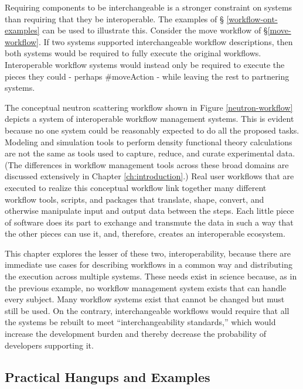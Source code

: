 Requiring components to be interchangeable is a stronger constraint on systems
than requiring that they be interoperable. The examples of \S
\ref{workflow-ont-examples} can be used to illustrate this. Consider the move
workflow of \S \ref{move-workflow}. If two systems supported interchangeable
workflow descriptions, then both systems would be required to fully execute the
original workflows. Interoperable workflow systems would instead only be
required to execute the pieces they could - perhaps \#moveAction - while leaving
the rest to partnering systems.

The conceptual neutron scattering workflow shown in Figure
\ref{neutron-workflow} depicts a system of interoperable workflow management
systems. This is evident because no one system could be reasonably expected to
do all the proposed tasks. Modeling and simulation tools to perform density
functional theory calculations are not the same as tools used to capture,
reduce, and curate experimental data. (The differences in workflow management tools
across these broad domains are discussed extensively in Chapter
\ref{ch:introduction}.) Real user workflows that are executed to realize this
conceptual workflow link together many different workflow tools, scripts, and
packages that translate, shape, convert, and otherwise manipulate input and
output data between the steps. Each little piece of software does its part to
exchange and transmute the data in such a way that the other pieces can use it,
and, therefore, creates an interoperable ecosystem.

This chapter explores the lesser of these two, interoperability, because there
are immediate use cases for describing workflows in a common way and
distributing the execution across multiple systems. These needs exist in
science because, as in the previous example, no workflow management system
exists that can handle every subject. Many workflow systems exist that cannot be
changed but must still be used. On the contrary, interchangeable workflows
would require that all the systems be rebuilt to meet ``interchangeability
standards,'' which would increase the development burden and thereby decrease
the probability of developers supporting it.

\subsection{Practical Hangups and Examples}
\label{practicality}

